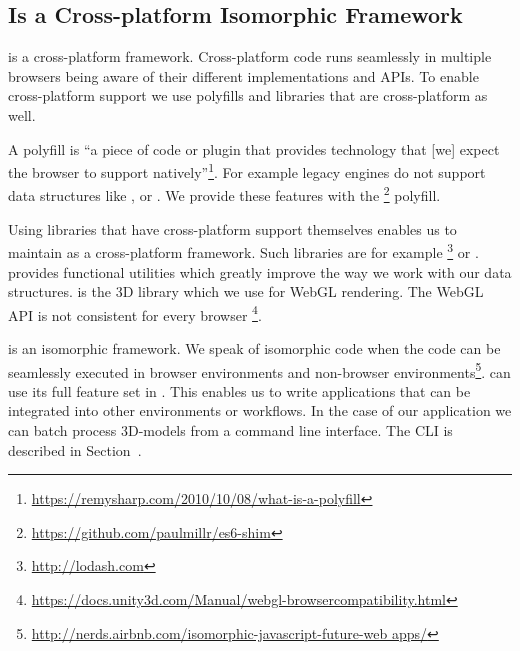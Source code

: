 \documentclass[../../ClassicThesis.tex]{subfiles}
\begin{document}


\subsection{{\convertify} Is a Cross-platform Isomorphic Framework}
\label{sec:convertify-is-isomorphic}

{\convertify} is a cross-platform framework. Cross-platform
{\javascript} code runs seamlessly in multiple browsers
being aware of their different implementations and APIs.
To enable cross-platform {\javascript} support we use
polyfills and libraries that are cross-platform as well.

A polyfill is \enquote{a piece of code or plugin that
  provides technology that [we] expect the browser to
  support
  natively}\footnote{\url{https://remysharp.com/2010/10/08/what-is-a-polyfill}}.
For example legacy {\javascript} engines do not support data
structures like ,  or
. We provide these features with the
\footnote{\url{https://github.com/paulmillr/es6-shim}}
polyfill.

Using libraries that have cross-platform support themselves enables us
to maintain {\convertify} as a cross-platform framework. Such
libraries are for example
\footnote{\url{http://lodash.com}} or {\threejs}.
 provides functional utilities which greatly improve the
way we work with our data structures. {\threejs} is the 3D library
which we use for WebGL rendering. The WebGL API is not consistent for every browser
\footnote{\url{https://docs.unity3d.com/Manual/webgl-browsercompatibility.html}}.


{\convertify} is an isomorphic framework. We speak of
isomorphic {\javascript} code when the code can be
seamlessly executed in browser environments and non-browser
environments\footnote{\url{http://nerds.airbnb.com/isomorphic-javascript-future-web
    apps/}}.
{\convertify} can use its full feature set in {\nodejs}.
This enables us to write applications that can be integrated
into other environments or workflows. In the case of our
application {\platener} we can batch process 3D-models from
a command line interface. The CLI is described in
Section~.
\end{document}
